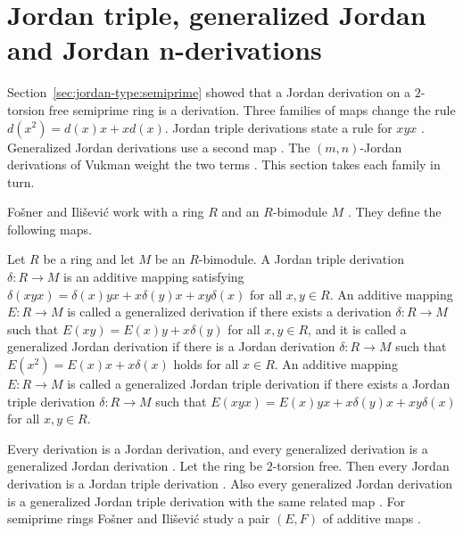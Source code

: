 \section{Jordan triple, generalized Jordan and Jordan n-derivations}\label{sec:jordan-type:triple-and-generalized}

Section~\ref{sec:jordan-type:semiprime} showed that a Jordan derivation on a $2$-torsion free
semiprime ring is a derivation. Three families of maps change the rule $d(x^{2})=d(x)x+xd(x)$. Jordan triple derivations
state a rule for $xyx$ \cite[p.~416]{FosnerIlisevic2008}. Generalized Jordan derivations use a
second map \cite[p.~1]{FerreiraGuzzoFerreira2020}. The $(m,n)$-Jordan derivations of Vukman
weight the two terms \cite[p.~1881]{MajeedOzel2014}. This section takes each family in turn.

Fošner and Ilišević work with a ring $R$ and an $R$-bimodule $M$
\cite[p.~416]{FosnerIlisevic2008}. They define the following maps.

\begin{definition}\label{def:jordan:triple-generalized}
Let $R$ be a ring and let $M$ be an $R$-bimodule. A Jordan triple derivation $\delta\colon R\to M$
is an additive mapping satisfying $\delta(xyx)=\delta(x)yx+x\delta(y)x+xy\delta(x)$ for all
$x,y\in R$. An additive mapping $E\colon R\to M$ is called a generalized derivation if there
exists a derivation $\delta\colon R\to M$ such that $E(xy)=E(x)y+x\delta(y)$ for all $x,y\in R$,
and it is called a generalized Jordan derivation if there is a Jordan derivation
$\delta\colon R\to M$ such that $E(x^{2})=E(x)x+x\delta(x)$ holds for all $x\in R$. An additive
mapping $E\colon R\to M$ is called a generalized Jordan triple derivation if there exists a
Jordan triple derivation $\delta\colon R\to M$ such that
$E(xyx)=E(x)yx+x\delta(y)x+xy\delta(x)$ for all $x,y\in R$.
\end{definition}

Every derivation is a Jordan derivation, and every generalized derivation is a generalized Jordan
derivation \cite[p.~416]{FosnerIlisevic2008}. Let the ring be $2$-torsion free. Then every Jordan
derivation is a Jordan triple derivation \cite[p.~416]{FosnerIlisevic2008}. Also every generalized
Jordan derivation is a generalized Jordan triple derivation with the same related map
\cite[p.~416]{FosnerIlisevic2008}. For semiprime rings
Fošner and Ilišević study a pair $(E,F)$ of additive maps \cite[p.~423]{FosnerIlisevic2008}.

